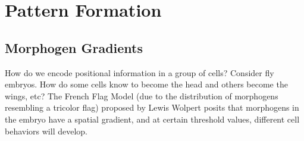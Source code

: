 \documentclass[a4paper,twoside,master.tex]{subfiles}
\begin{document}
\chapter{Pattern Formation}

\section{Morphogen Gradients}\label{sec:morphogen_gradients}

How do we encode positional information in a group of cells? Consider fly embryos. How do some cells know to become the head and others become the wings, etc? The French Flag Model (due to the distribution of morphogens resembling a tricolor flag) proposed by Lewis Wolpert posits that morphogens in the embryo have a spatial gradient, and at certain threshold values, different cell behaviors will develop.
\end{document}
